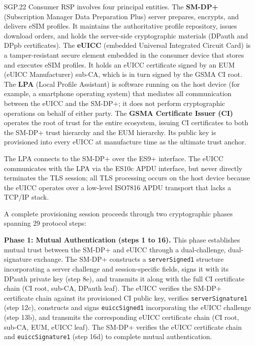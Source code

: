 \documentclass[a4paper,fleqn]{cas-sc}
\begin{document}
SGP.22 Consumer RSP involves four principal entities. The \textbf{SM-DP+}
(Subscription Manager Data Preparation Plus) server prepares, encrypts,
and delivers eSIM profiles. It maintains the authoritative profile
repository, issues download orders, and holds the server-side
cryptographic materials (DPauth and DPpb certificates). The
\textbf{eUICC} (embedded Universal Integrated Circuit Card) is a
tamper-resistant secure element embedded in the consumer device that
stores and executes eSIM profiles. It holds an eUICC certificate signed
by an EUM (eUICC Manufacturer) sub-CA, which is in turn signed by the GSMA
CI root. The \textbf{LPA} (Local Profile Assistant) is software running on
the host device (for example, a smartphone operating system) that mediates
all communication between the eUICC and the SM-DP+; it does not perform
cryptographic operations on behalf of either party. The \textbf{GSMA
Certificate Issuer (CI)} operates the root of trust for the entire
ecosystem, issuing CI certificates to both the SM-DP+ trust hierarchy
and the EUM hierarchy. Its public key is provisioned into every eUICC at
manufacture time as the ultimate trust anchor.

The LPA connects to the SM-DP+ over the ES9+ interface. The eUICC communicates with the
LPA via the ES10c APDU interface, but never directly terminates the TLS
session; all TLS processing occurs on the host device because the eUICC
operates over a low-level ISO7816 APDU transport that lacks a TCP/IP stack.

A complete provisioning session proceeds through two cryptographic phases
spanning 29 protocol steps:

\textbf{Phase 1: Mutual Authentication (steps 1 to 16).} This phase
establishes mutual trust between the SM-DP+ and eUICC through a
dual-challenge, dual-signature exchange. The SM-DP+ constructs a
\texttt{serverSigned1} structure incorporating a server challenge and
session-specific fields, signs it with its DPauth private key (step 8e),
and transmits it along with the full CI certificate chain (CI root,
sub-CA, DPauth leaf). The eUICC verifies the SM-DP+ certificate chain
against its provisioned CI public key, verifies \texttt{serverSignature1}
(step 12c), constructs and signs \texttt{euiccSigned1} incorporating the
eUICC challenge (step 13b), and transmits the corresponding eUICC
certificate chain (CI root, sub-CA, EUM, eUICC leaf). The SM-DP+
verifies the eUICC certificate chain and \texttt{euiccSignature1}
(step 16d) to complete mutual authentication.
\end{document}
